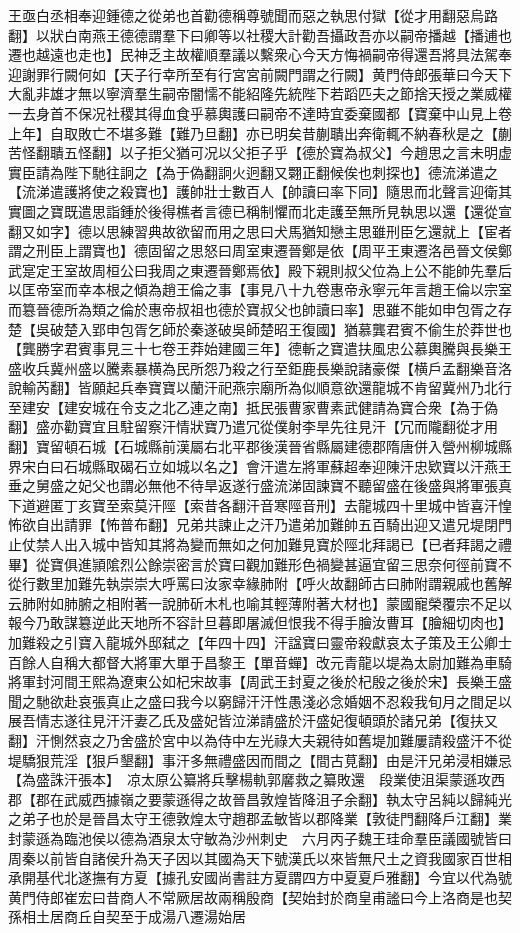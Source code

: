 王亟白丞相奉迎鍾德之從弟也首勸德稱尊號聞而惡之執思付獄【從才用翻惡烏路翻】以狀白南燕王德德謂羣下曰卿等以社稷大計勸吾攝政吾亦以嗣帝播越【播逋也遷也越遠也走也】民神乏主故權順羣議以繫衆心今天方悔禍嗣帝得還吾將具法駕奉迎謝罪行闕何如【天子行幸所至有行宮宮前闕門謂之行闕】黄門侍郎張華曰今天下大亂非雄才無以寧濟羣生嗣帝闇懦不能紹隆先統陛下若蹈匹夫之節捨天授之業威權一去身首不保况社稷其得血食乎慕輿護曰嗣帝不達時宜委棄國都【寶棄中山見上卷上年】自取敗亡不堪多難【難乃旦翻】亦已明矣昔蒯聵出奔衛輒不納春秋是之【蒯苦怪翻聵五怪翻】以子拒父猶可况以父拒子乎【德於寶為叔父】今趙思之言未明虚實臣請為陛下馳往詗之【為于偽翻詗火迥翻又翾正翻候俟也刺探也】德流涕遣之【流涕遣護將使之殺寶也】護帥壯士數百人【帥讀曰率下同】隨思而北聲言迎衛其實圖之寶既遣思詣鍾於後得樵者言德已稱制懼而北走護至無所見執思以還【還從宣翻又如字】德以思練習典故欲留而用之思曰犬馬猶知戀主思雖刑臣乞還就上【宦者謂之刑臣上謂寶也】德固留之思怒曰周室東遷晉鄭是依【周平王東遷洛邑晉文侯鄭武寔定王室故周桓公曰我周之東遷晉鄭焉依】殿下親則叔父位為上公不能帥先羣后以匡帝室而幸本根之傾為趙王倫之事【事見八十九卷惠帝永寧元年言趙王倫以宗室而簒晉德所為類之倫於惠帝叔祖也德於寶叔父也帥讀曰率】思雖不能如申包胥之存楚【吳破楚入郢申包胥乞師於秦遂破吳師楚昭王復國】猶慕龔君賓不偷生於莽世也【龔勝字君賓事見三十七卷王莽始建國三年】德斬之寶遣扶風忠公慕輿騰與長樂王盛收兵冀州盛以騰素暴横為民所怨乃殺之行至鉅鹿長樂說諸豪傑【横戶孟翻樂音洛說輸芮翻】皆願起兵奉寶寶以蘭汗祀燕宗廟所為似順意欲還龍城不肯留冀州乃北行至建安【建安城在令支之北乙連之南】抵民張曹家曹素武健請為寶合衆【為于偽翻】盛亦勸寶宜且駐留察汗情狀寶乃遣冗從僕射李旱先往見汗【冗而隴翻從才用翻】寶留頓石城【石城縣前漢屬右北平郡後漢晉省縣屬建德郡隋唐併入營州柳城縣界宋白曰石城縣取碣石立如城以名之】會汗遣左將軍蘇超奉迎陳汗忠欵寶以汗燕王垂之舅盛之妃父也謂必無他不待旱返遂行盛流涕固諫寶不聽留盛在後盛與將軍張真下道避匿丁亥寶至索莫汗陘【索昔各翻汗音寒陘音刑】去龍城四十里城中皆喜汗惶怖欲自出請罪【怖普布翻】兄弟共諫止之汗乃遣弟加難帥五百騎出迎又遣兄堤閉門止仗禁人出入城中皆知其將為變而無如之何加難見寶於陘北拜謁已【已者拜謁之禮畢】從寶俱進頴隂烈公餘崇密言於寶曰觀加難形色禍變甚逼宜留三思奈何徑前寶不從行數里加難先執崇崇大呼罵曰汝家幸緣肺附【呼火故翻師古曰肺附謂親戚也舊解云肺附如肺腑之相附著一說肺斫木札也喻其輕薄附著大材也】蒙國寵榮覆宗不足以報今乃敢謀簒逆此天地所不容計旦暮即屠滅但恨我不得手膾汝曹耳【膾細切肉也】加難殺之引寶入龍城外邸弑之【年四十四】汗諡寶曰靈帝殺獻哀太子策及王公卿士百餘人自稱大都督大將軍大單于昌黎王【單音蟬】改元青龍以堤為太尉加難為車騎將軍封河間王熙為遼東公如杞宋故事【周武王封夏之後於杞殷之後於宋】長樂王盛聞之馳欲赴哀張真止之盛曰我今以窮歸汗汗性愚淺必念婚姻不忍殺我旬月之間足以展吾情志遂往見汗汗妻乙氏及盛妃皆泣涕請盛於汗盛妃復頓頭於諸兄弟【復扶又翻】汗惻然哀之乃舍盛於宮中以為侍中左光祿大夫親待如舊堤加難屢請殺盛汗不從堤驕狠荒淫【狠戶墾翻】事汗多無禮盛因而間之【間古莧翻】由是汗兄弟浸相嫌忌【為盛誅汗張本】　凉太原公纂將兵擊楊軌郭黁救之纂敗還　段業使沮渠蒙遜攻西郡【郡在武威西據嶺之要蒙遜得之故晉昌敦煌皆降沮子余翻】執太守呂純以歸純光之弟子也於是晉昌太守王德敦煌太守趙郡孟敏皆以郡降業【敦徒門翻降戶江翻】業封蒙遜為臨池侯以德為酒泉太守敏為沙州刺史　六月丙子魏王珪命羣臣議國號皆曰周秦以前皆自諸侯升為天子因以其國為天下號漢氏以來皆無尺土之資我國家百世相承開基代北遂撫有方夏【據孔安國尚書註方夏謂四方中夏夏戶雅翻】今宜以代為號黄門侍郎崔宏曰昔商人不常厥居故兩稱殷商【契始封於商皇甫謐曰今上洛商是也契孫相土居商丘自契至于成湯八遷湯始居